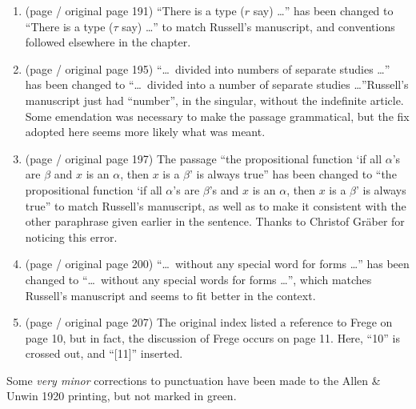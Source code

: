 \begin{enumerate}
to make it ``How shall we define a ``typical Frenchman''?'' Although Russell's manuscript is not entirely clear here, it appears the latter was intended, and it also seems to make more sense
in context. 
\item (page \pageref{change:tau} / original page 191) ``There is a type (\ensuremath{r} say) \ldots'' has been changed to ``There is a type (\ensuremath{\tau} say) \ldots'' to match Russell's man\-u\-script, and conventions followed elsewhere in the chapter.
\item (page \pageref{change:numbersanumber} / original page 195) ``\ldots\ div\-id\-ed into numbers of separate studies \ldots'' has been
changed to ``\ldots\ div\-id\-ed into a number of separate studies \ldots''\kksentencespace Russell's man\-u\-script just
had ``number'', in the singular, without the indefinite article. Some emendation was necessary
to make the passage grammatical, but the fix adopted here seems more likely what was meant.
\item (page \pageref{change:betas} / original page 197) The passage ``the propositional function `if all $\alpha$'s are $\beta$ and $x$ is an $\alpha$, then $x$ is a $\beta$' is always true'' has been changed to ``the propositional function `if all $\alpha$'s are $\beta$'s and $x$ is an $\alpha$, then $x$ is a $\beta$' is always true'' to match Russell's manuscript, as well as to make it consistent with the other paraphrase given earlier in the sentence. Thanks to Christof Gr{\"a}ber for noticing this error.
\item (page \pageref{change:wordwords} / original page 200) ``\ldots\ with\-out any special 
word for forms \ldots'' has been changed to ``\ldots\ without any special words for forms \ldots'',
which match\-es Russell's man\-u\-script and seems to fit better in the context. 
\item (page \pageref{change:fregeindex} / original page 207) The original index listed a reference
to Frege on page 10, but in fact, the discussion of Frege occurs on page 11. Here, ``10''
is crossed out, and ``[11]'' inserted.
\end{enumerate}
Some \textit{very minor} corrections to punctuation have been made to the Allen \& Unwin 1920 printing, but not
marked in green. 
